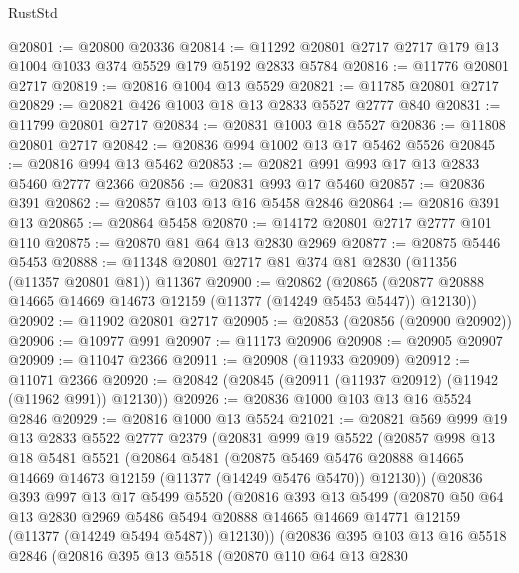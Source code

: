 \begin{lexlean}{RustStd}
\begin{coremodule}
@20801 := @20800 @20336
@20814 := @11292 @20801 @2717 @2717 @179 @13 @1004 @1033 @374 @5529 @179 @5192 @2833 @5784
@20816 := @11776 @20801 @2717
@20819 := @20816 @1004 @13 @5529
@20821 := @11785 @20801 @2717
@20829 := @20821 @426 @1003 @18 @13 @2833 @5527 @2777 @840
@20831 := @11799 @20801 @2717
@20834 := @20831 @1003 @18 @5527
@20836 := @11808 @20801 @2717
@20842 := @20836 @994 @1002 @13 @17 @5462 @5526
@20845 := @20816 @994 @13 @5462
@20853 := @20821 @991 @993 @17 @13 @2833 @5460 @2777 @2366
@20856 := @20831 @993 @17 @5460
@20857 := @20836 @391
@20862 := @20857 @103 @13 @16 @5458 @2846
@20864 := @20816 @391 @13
@20865 := @20864 @5458
@20870 := @14172 @20801 @2717 @2777 @101 @110
@20875 := @20870 @81 @64 @13 @2830 @2969
@20877 := @20875 @5446 @5453
@20888 := @11348 @20801 @2717 @81 @374 @81 @2830 (@11356 (@11357 @20801 @81)) @11367
@20900 := @20862
    (@20865 (@20877 @20888 @14665 @14669 @14673 @12159 (@11377 (@14249 @5453 @5447)) @12130))
@20902 := @11902 @20801 @2717
@20905 := @20853 (@20856 (@20900 @20902))
@20906 := @10977 @991
@20907 := @11173 @20906
@20908 := @20905 @20907
@20909 := @11047 @2366
@20911 := @20908 (@11933 @20909)
@20912 := @11071 @2366
@20920 := @20842 (@20845 (@20911 (@11937 @20912) (@11942 (@11962 @991)) @12130))
@20926 := @20836 @1000 @103 @13 @16 @5524 @2846
@20929 := @20816 @1000 @13 @5524
@21021 := @20821
    @569
    @999
    @19
    @13
    @2833
    @5522
    @2777
    @2379
    (@20831
      @999
      @19
      @5522
      (@20857
        @998
        @13
        @18
        @5481
        @5521
        (@20864
          @5481
          (@20875
            @5469
            @5476
            @20888
            @14665
            @14669
            @14673
            @12159
            (@11377 (@14249 @5476 @5470))
            @12130))
        (@20836
          @393
          @997
          @13
          @17
          @5499
          @5520
          (@20816
            @393
            @13
            @5499
            (@20870
              @50
              @64
              @13
              @2830
              @2969
              @5486
              @5494
              @20888
              @14665
              @14669
              @14771
              @12159
              (@11377 (@14249 @5494 @5487))
              @12130))
          (@20836
            @395
            @103
            @13
            @16
            @5518
            @2846
            (@20816
              @395
              @13
              @5518
              (@20870
                @110
                @64
                @13
                @2830

\end{coremodule}
\end{lexlean}
